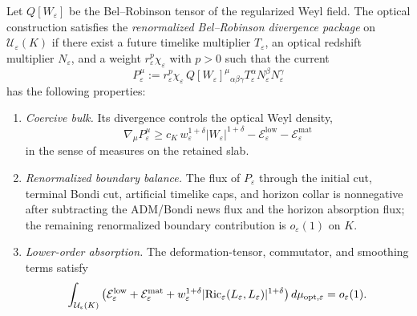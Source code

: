 \begin{definition}\label{def:RenormalizedBelRobinsonDivergencePackage}
Let $Q[W_\varepsilon]$ be the Bel--Robinson tensor of the regularized Weyl field. The optical construction satisfies the \emph{renormalized Bel--Robinson divergence package} on $\mathcal U_\varepsilon(K)$ if there exist a future timelike multiplier $T_\varepsilon$, an optical redshift multiplier $N_\varepsilon$, and a weight $r_\varepsilon^p\chi_\varepsilon$ with $p>0$ such that the current
\[
    P_\varepsilon^\mu
    :=
    r_\varepsilon^p\chi_\varepsilon\,
    Q[W_\varepsilon]^\mu{}_{\alpha\beta\gamma}
    T_\varepsilon^\alpha N_\varepsilon^\beta N_\varepsilon^\gamma
\]
has the following properties:
\begin{enumerate}
    \item \emph{Coercive bulk.} Its divergence controls the optical Weyl density,
    \[
        \nabla_\mu P_\varepsilon^\mu
        \ge
        c_K\,w_\varepsilon^{1+\delta}|W_\varepsilon|^{1+\delta}
        -\mathcal E_{\varepsilon}^{\mathrm{low}}
        -\mathcal E_{\varepsilon}^{\mathrm{mat}}
    \]
    in the sense of measures on the retained slab.
    \item \emph{Renormalized boundary balance.} The flux of $P_\varepsilon$ through the initial cut, terminal Bondi cut, artificial timelike caps, and horizon collar is nonnegative after subtracting the ADM/Bondi news flux and the horizon absorption flux; the remaining renormalized boundary contribution is $o_\varepsilon(1)$ on $K$.
    \item \emph{Lower-order absorption.} The deformation-tensor, commutator, and smoothing terms satisfy
    \[
        \int_{\mathcal U_\varepsilon(K)}
        \left(
            \mathcal E_{\varepsilon}^{\mathrm{low}}
            +\mathcal E_{\varepsilon}^{\mathrm{mat}}
            +w_\varepsilon^{1+\delta}|\mathrm{Ric}_\varepsilon(L_\varepsilon,L_\varepsilon)|^{1+\delta}
        \right)
        d\mu_{\mathrm{opt},\varepsilon}
        =
        o_\varepsilon(1).
    \]
\end{enumerate}
\end{definition}


